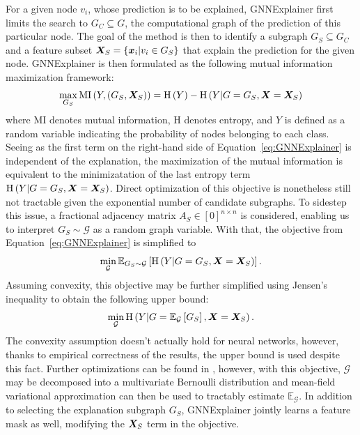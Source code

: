 For a given node \( v_i \), whose prediction is to be explained, GNNExplainer first limits the search to \( G_C \subseteq G \), the computational graph of the prediction of this particular node. The goal of the method is then to identify a subgraph \( G_S \subseteq G_C \) and a feature subset \( \bm{X}_S = \left\{ \bm{x}_i \middle| v_i \in G_S \right\} \) that explain the prediction for the given node. GNNExplainer is then formulated as the following mutual information maximization framework:
\begin{equation}\label{eq:GNNExplainer}
	\max_{G_S} \mathrm{MI} \left( Y, \left( G_S, \bm{X}_S \right) \right) = \mathrm{H} \left( Y \right) - \mathrm{H} \left( Y \middle| G = G_S, \bm{X} = \bm{X}_S \right)
\end{equation}
where \( \mathrm{MI} \) denotes mutual information, \( \mathrm{H} \) denotes entropy, and \( Y \) is defined as a random variable indicating the probability of nodes belonging to each class. Seeing as the first term on the right-hand side of Equation~\ref{eq:GNNExplainer} is independent of the explanation, the maximization of the mutual information is equivalent to the minimizatation of the last entropy term \( \mathrm{H} \left( Y \middle| G = G_S, \bm{X} = \bm{X}_S \right) \). Direct optimization of this objective is nonetheless still not tractable given the exponential number of candidate subgraphs. To sidestep this issue, a fractional adjacency matrix \( A_S \in \left[ 0 \right]^{n \times n} \) is considered, enabling us to interpret \( G_S \sim \mathcal{G} \) as a random graph variable. With that, the objective from Equation~\ref{eq:GNNExplainer} is simplified to
\begin{equation}
	\min_{\mathcal{G}} \mathbb{E}_{G_S \sim \mathcal{G}} \left[ \mathrm{H} \left( Y \middle| G = G_S, \bm{X} = \bm{X}_S \right) \right].
\end{equation}
Assuming convexity, this objective may be further simplified using Jensen's inequality to obtain the following upper bound:
\begin{equation}
	\min_{\mathcal{G}} \mathrm{H} \left( Y \middle| G = \mathbb{E}_\mathcal{G} \left[ G_S \right], \bm{X} = \bm{X}_S \right).
\end{equation}
The convexity assumption doesn't actually hold for neural networks, however, thanks to empirical correctness of the results, the upper bound is used despite this fact. Further optimizations can be found in \cite{ying_gnnexplainer_2019}, however, with this objective, \( \mathcal{G} \) may be decomposed into a multivariate Bernoulli distribution and mean-field variational approximation can then be used to tractably estimate \( \mathbb{E}_\mathcal{G} \). In addition to selecting the explanation subgraph \( G_S \), GNNExplainer jointly learns a feature mask as well, modifying the \( \bm{X}_S \) term in the objective.

